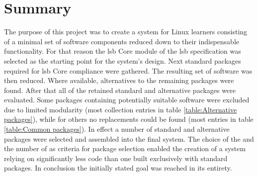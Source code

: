 \section{Summary}\label{Summary}

The purpose of this project was to create a system for Linux learners consisting of a minimal set of software components reduced down to their indispensable functionality. For that reason the \gls{lsb} Core module of the \gls{lsb} specification was selected as the starting point for the system's design. Next standard packages required for \gls{lsb} Core compliance were gathered. The resulting set of software was then reduced. Where available, alternatives to the remaining packages were found. After that all of the retained standard and alternative packages were evaluated. Some packages containing potentially suitable software were excluded due to limited modularity (most collection entries in table \ref{table:Alternative packages}), while for others no replacements could be found (most entries in table \ref{table:Common packages}). In effect a number of standard and alternative packages were selected and assembled into the final system. The choice of the  and the number of  as criteria for package selection enabled the creation of a system relying on significantly less code than one built exclusively with standard packages. In conclusion the initially stated goal was reached in its entirety.

